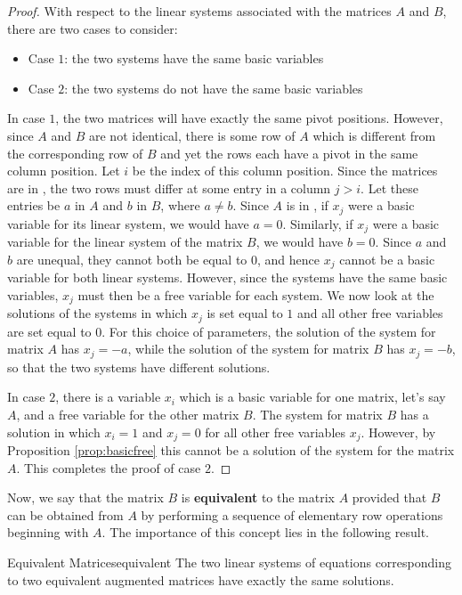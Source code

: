 \begin{proof}
With respect to the linear systems associated with the matrices $A$ and $B$, there are two cases to consider:
\begin{itemize}
\item Case $1$: the two systems have the same basic variables
\item Case $2$: the two systems do not have the same basic variables
\end{itemize}
In case $1$, the two matrices will have exactly the same pivot positions. However, since $A$ and $B$ are not identical, there is some row of $A$ which is different from the corresponding row of $B$ and yet the rows each have a pivot in the same column position. Let $i$ be the index of this column position. Since the matrices are in {\rref}, the two rows must differ at some entry in a column $j>i$. Let these entries be $a$ in $A$ and $b$ in $B$, where $a \neq b$. Since $A$ is in {\rref}, if $x_j$ were a basic variable for its linear system, we would have $a=0$. Similarly, if $x_j$ were a basic variable for the linear system of the matrix $B$, we would have $b=0$. Since $a$ and $b$ are unequal, they cannot both be equal to $0$, and hence $x_j$ cannot be a basic variable for both linear systems. However, since the systems have the same basic variables, $x_j$ must then be a free variable for each system. We now look at the solutions of the systems in which $x_j$ is set equal to $1$ and all other free variables are set equal to $0$. For this choice of parameters, the solution of the system for matrix $A$ has $x_j=-a$, while the solution of the system for matrix $B$ has $x_j=-b$, so that the two systems have different solutions.

In case $2$, there is a variable $x_i$ which is a basic variable for one matrix, let's say $A$, and a free variable for the other matrix $B$. The system for matrix $B$ has a solution in which $x_i=1$ and $x_j=0$ for all other free variables $x_j$. However, by Proposition \ref{prop:basicfree} this cannot be a solution of the system for the matrix $A$. This completes the proof of case $2$.
\end{proof}

Now, we say that the matrix $B$ is \textbf{equivalent}  to the matrix $A$ provided that $B$ can be obtained from $A$ by performing a sequence of elementary row operations beginning with $A$. The importance of this concept lies in the following result.

\begin{theorem}{Equivalent Matrices}{equivalent}
The two linear systems of equations corresponding to two equivalent augmented matrices have exactly the same solutions.
\end{theorem}

